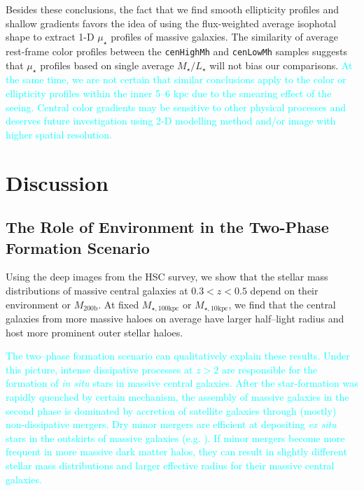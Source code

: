 \documentclass[a4paper,fleqn,usenatbib]{mnras}
\def\rbcg{\texttt{cenHighMh}}
\def\nbcg{\texttt{cenLowMh}}
\def\mhalo{{$M_{\mathrm{200b}}$}}
\def\minn{{$M_{\star,10\mathrm{kpc}}$}}
\def\mtot{{$M_{\star,100\mathrm{kpc}}$}}
\def\m2l{{$M_{\star}/L_{\star}$}}
\def\mden{{$\mu_{\star}$}}
\newcommand{\song}[1]{\textcolor{cyan}{#1}}
\begin{document}
    Besides these conclusions, the fact that we find smooth ellipticity profiles and 
    shallow gradients favors the idea of using the flux-weighted average isophotal 
    shape to extract 1-D \mden{} profiles of massive galaxies. 
    The similarity of average rest-frame color profiles between the \rbcg{} and \nbcg{}
    samples suggests that \mden{} profiles based on single average \m2l{} will not bias 
    our comparisons. 
    \song{
    At the same time, we are not certain that similar conclusions apply to the 
    color or ellipticity profiles within the inner 5--6 kpc due to the smearing effect
    of the seeing. 
    Central color gradients may be sensitive to other physical processes and deserves 
    future investigation using 2-D modelling method and/or image with higher spatial 
    resolution.
    }
    
   

\section{Discussion}
    \label{sec:discussion}

\subsection{The Role of Environment in the Two-Phase Formation Scenario}
            
    Using the deep images from the HSC survey, we show that the stellar mass 
    distributions of massive central galaxies at $0.3 < z < 0.5$ depend on their 
    environment or \mhalo{}. 
    At fixed \mtot{} or \minn{}, we find that the central galaxies from more massive 
    haloes on average have larger half--light radius and host more prominent outer 
    stellar haloes. 
    
    \song{
    The two--phase formation scenario can qualitatively explain these results. 
    Under this picture, intense dissipative processes at $z > 2$ are 
    responsible for the formation of \textit{in situ} stars in massive central 
    galaxies. 
    After the star-formation was rapidly quenched by certain mechanism, the 
    assembly of massive galaxies in the second phase is dominated by accretion 
    of satellite galaxies through (mostly) non-dissipative mergers. 
    Dry minor mergers are efficient at depositing \textit{ex situ} stars in the 
    outskirts of massive galaxies (e.g. \citealt{Oogi2013, Bedorf2013}). 
    If minor mergers become more frequent in more massive dark matter halos, 
    they can result in slightly different stellar mass distributions and larger 
    effective radius for their massive central galaxies.
    }
      
\end{document}
